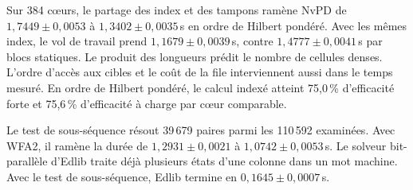 Sur 384 cœurs, le partage des index et des tampons ramène NvPD de \(1{,}7449\pm0{,}0053\) à \(1{,}3402\pm0{,}0035\)\,s en ordre de Hilbert pondéré. Avec les mêmes index, le vol de travail prend \(1{,}1679\pm0{,}0039\)\,s, contre \(1{,}4777\pm0{,}0041\)\,s par blocs statiques. Le produit des longueurs prédit le nombre de cellules denses. L'ordre d'accès aux cibles et le coût de la file interviennent aussi dans le temps mesuré. En ordre de Hilbert pondéré, le calcul indexé atteint 75,0\,\% d’efficacité forte et 75,6\,\% d’efficacité à charge par cœur comparable.

Le test de sous-séquence résout 39\,679 paires parmi les 110\,592 examinées. Avec WFA2, il ramène la durée de \(1{,}2931\pm0{,}0021\) à \(1{,}0742\pm0{,}0053\)\,s. Le solveur bit-parallèle d'Edlib traite déjà plusieurs états d'une colonne dans un mot machine. Avec le test de sous-séquence, Edlib termine en \(0{,}1645\pm0{,}0007\)\,s.

